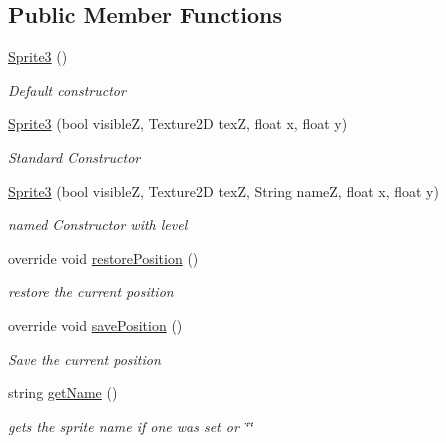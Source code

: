 \subsection*{Public Member Functions}
\begin{DoxyCompactItemize}
\item 
\mbox{\hyperlink{class_r_c___framework_1_1_sprite3_a92d70269202bf98ede05cbc45ca3690a}{Sprite3}} ()
\begin{DoxyCompactList}\small\item\em Default constructor \end{DoxyCompactList}\item 
\mbox{\hyperlink{class_r_c___framework_1_1_sprite3_a497f021ee596994c26f0d83135b676f5}{Sprite3}} (bool visibleZ, Texture2D texZ, float x, float y)
\begin{DoxyCompactList}\small\item\em Standard Constructor \end{DoxyCompactList}\item 
\mbox{\hyperlink{class_r_c___framework_1_1_sprite3_a5157f6fac4128e14e3a28ba540daec37}{Sprite3}} (bool visibleZ, Texture2D texZ, String nameZ, float x, float y)
\begin{DoxyCompactList}\small\item\em named Constructor with level \end{DoxyCompactList}\item 
override void \mbox{\hyperlink{class_r_c___framework_1_1_sprite3_a4ffc487d5c332dee276909dad3dba57a}{restore\+Position}} ()
\begin{DoxyCompactList}\small\item\em restore the current position \end{DoxyCompactList}\item 
override void \mbox{\hyperlink{class_r_c___framework_1_1_sprite3_ae4733340c18c8098b250418081020c6a}{save\+Position}} ()
\begin{DoxyCompactList}\small\item\em Save the current position \end{DoxyCompactList}\item 
string \mbox{\hyperlink{class_r_c___framework_1_1_sprite3_afa836f90205eb82c09f948e01c0e47ca}{get\+Name}} ()
\begin{DoxyCompactList}\small\item\em gets the sprite name if one was set or \char`\"{}\char`\"{} \end{DoxyCompactList}\item 

\end{DoxyCompactItemize}
